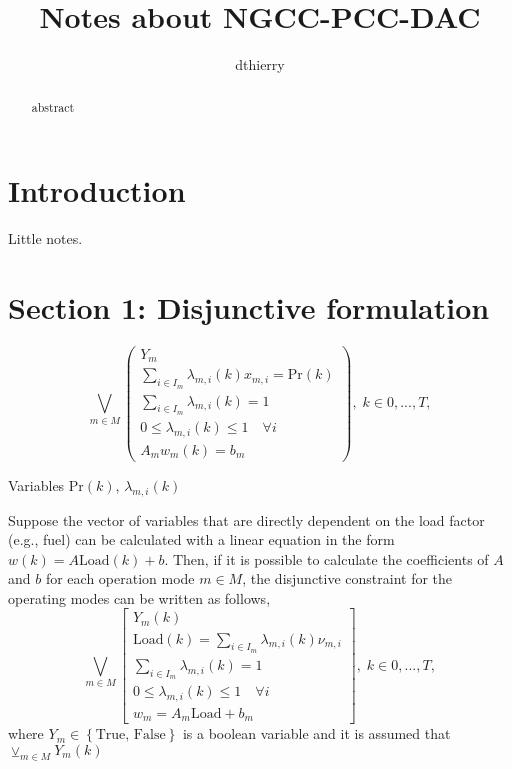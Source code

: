 \documentclass{tufte-handout}
\title{Notes about NGCC-PCC-DAC}
\author{dthierry}
\begin{document}
\maketitle

\begin{abstract}
\noindent abstract
\end{abstract}



\section{Introduction}

Little notes.

\section{Section 1: Disjunctive formulation}

\begin{equation}
	\bigvee_{m \in M}
	\begin{pmatrix} 
    Y_m \\
		\sum_{i \in I_m} \lambda_{m,i} \left(k \right) x_{m, i} = \text{Pr} \left(k\right)
		\\ 
		\sum_{i \in I_m} \lambda_{m,i} \left(k \right) = 1 \\
    0 \leq \lambda_{m,i} \left(k \right) \leq 1 \quad \forall i \\
    A_m w_{m}\left(k\right) = b_m
	\end{pmatrix}, \; k \in {0,...,T},
\end{equation}

Variables $\text{Pr}\left(k \right)$, $\lambda_{m,i} \left(k \right)$

Suppose the vector of variables that are directly dependent on the load factor (e.g., fuel) can be calculated with a linear equation in the form $w \left( k \right)= A \text{Load}\left(k \right) + b$. Then, if it is possible to calculate the coefficients of $A$ and $b$ for each operation mode $m \in M$, the disjunctive constraint for the operating modes can be written as follows, 
\begin{equation}
	\bigvee_{m \in M}
	\begin{bmatrix} 
    Y_m \left(k\right)\\
		\text{Load} \left(k\right) = \sum_{i \in I_m} \lambda_{m,i} \left(k \right) \nu_{m, i}
		\\ 
		\sum_{i \in I_m} \lambda_{m,i} \left(k \right) = 1 \\
    0 \leq \lambda_{m,i} \left(k \right) \leq 1 \quad \forall i \\
    w_m = A_m \text{Load} + b_m
	\end{bmatrix}, \; k \in {0,...,T},
\end{equation}
where $Y_m \in \left\{\text{True, False} \right\}$ is a boolean variable and it is assumed that $\veebar_{m \in M} Y_m \left(k\right)$
\end{document}
